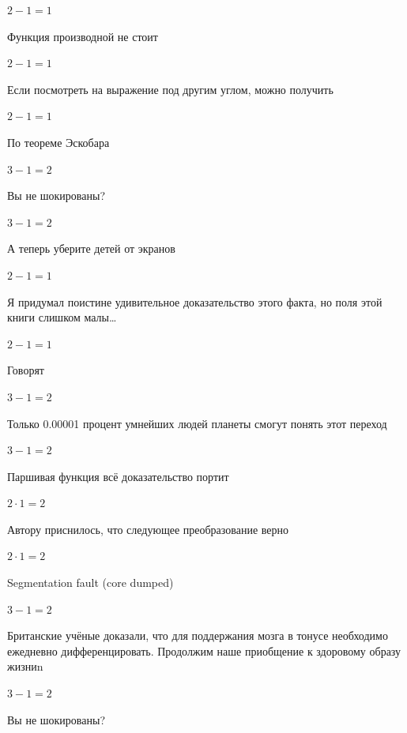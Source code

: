 \documentclass[12pt,a4paper,fleqn]{article}
\begin{document}
\begin{center}$2-1 = 1$\end{center}
Функция производной не стоит\cite{link2}

\begin{center}$2-1 = 1$\end{center}
Если посмотреть на выражение под другим углом, можно получить

\begin{center}$2-1 = 1$\end{center}
По теореме Эскобара

\begin{center}$3-1 = 2$\end{center}
Вы не шокированы?\cite{link3}

\begin{center}$3-1 = 2$\end{center}
А теперь уберите детей от экранов

\begin{center}$2-1 = 1$\end{center}
Я придумал поистине удивительное доказательство этого факта, но поля этой книги слишком малы\ldots

\begin{center}$2-1 = 1$\end{center}
Говорят

\begin{center}$3-1 = 2$\end{center}
Только 0.00001 процент умнейших людей планеты смогут понять этот переход

\begin{center}$3-1 = 2$\end{center}
Паршивая функция всё доказательство портит\cite{link2}

\begin{center}$2 \cdot 1 = 2$\end{center}
Автору приснилось, что следующее преобразование верно

\begin{center}$2 \cdot 1 = 2$\end{center}
Segmentation fault (core dumped)

\begin{center}$3-1 = 2$\end{center}
Британские учёные доказали, что для поддержания мозга в тонусе необходимо ежедневно дифференцировать. Продолжим наше приобщение к здоровому образу жизниn

\begin{center}$3-1 = 2$\end{center}
Вы не шокированы?\cite{link3}
\end{document}

